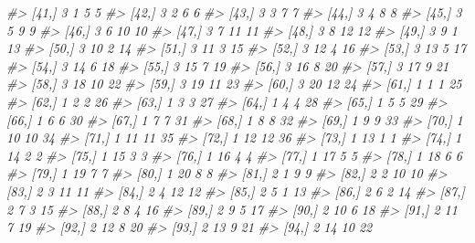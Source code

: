 \documentclass[]{book}
\newenvironment{Shaded}{\begin{snugshade}}{\end{snugshade}}
\newcommand{\CommentTok}[1]{\textcolor[rgb]{0.56,0.35,0.01}{\textit{#1}}}
\begin{document}
\begin{Shaded}
\begin{Highlighting}[]
\CommentTok{#>  [41,]   3      1       5      5}
\CommentTok{#>  [42,]   3      2       6      6}
\CommentTok{#>  [43,]   3      3       7      7}
\CommentTok{#>  [44,]   3      4       8      8}
\CommentTok{#>  [45,]   3      5       9      9}
\CommentTok{#>  [46,]   3      6      10     10}
\CommentTok{#>  [47,]   3      7      11     11}
\CommentTok{#>  [48,]   3      8      12     12}
\CommentTok{#>  [49,]   3      9       1     13}
\CommentTok{#>  [50,]   3     10       2     14}
\CommentTok{#>  [51,]   3     11       3     15}
\CommentTok{#>  [52,]   3     12       4     16}
\CommentTok{#>  [53,]   3     13       5     17}
\CommentTok{#>  [54,]   3     14       6     18}
\CommentTok{#>  [55,]   3     15       7     19}
\CommentTok{#>  [56,]   3     16       8     20}
\CommentTok{#>  [57,]   3     17       9     21}
\CommentTok{#>  [58,]   3     18      10     22}
\CommentTok{#>  [59,]   3     19      11     23}
\CommentTok{#>  [60,]   3     20      12     24}
\CommentTok{#>  [61,]   1      1       1     25}
\CommentTok{#>  [62,]   1      2       2     26}
\CommentTok{#>  [63,]   1      3       3     27}
\CommentTok{#>  [64,]   1      4       4     28}
\CommentTok{#>  [65,]   1      5       5     29}
\CommentTok{#>  [66,]   1      6       6     30}
\CommentTok{#>  [67,]   1      7       7     31}
\CommentTok{#>  [68,]   1      8       8     32}
\CommentTok{#>  [69,]   1      9       9     33}
\CommentTok{#>  [70,]   1     10      10     34}
\CommentTok{#>  [71,]   1     11      11     35}
\CommentTok{#>  [72,]   1     12      12     36}
\CommentTok{#>  [73,]   1     13       1      1}
\CommentTok{#>  [74,]   1     14       2      2}
\CommentTok{#>  [75,]   1     15       3      3}
\CommentTok{#>  [76,]   1     16       4      4}
\CommentTok{#>  [77,]   1     17       5      5}
\CommentTok{#>  [78,]   1     18       6      6}
\CommentTok{#>  [79,]   1     19       7      7}
\CommentTok{#>  [80,]   1     20       8      8}
\CommentTok{#>  [81,]   2      1       9      9}
\CommentTok{#>  [82,]   2      2      10     10}
\CommentTok{#>  [83,]   2      3      11     11}
\CommentTok{#>  [84,]   2      4      12     12}
\CommentTok{#>  [85,]   2      5       1     13}
\CommentTok{#>  [86,]   2      6       2     14}
\CommentTok{#>  [87,]   2      7       3     15}
\CommentTok{#>  [88,]   2      8       4     16}
\CommentTok{#>  [89,]   2      9       5     17}
\CommentTok{#>  [90,]   2     10       6     18}
\CommentTok{#>  [91,]   2     11       7     19}
\CommentTok{#>  [92,]   2     12       8     20}
\CommentTok{#>  [93,]   2     13       9     21}
\CommentTok{#>  [94,]   2     14      10     22}

\end{Highlighting}
\end{Shaded}
\end{document}
